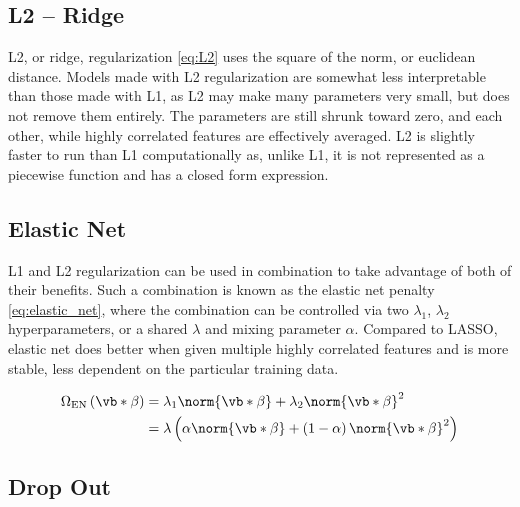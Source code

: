 \subsection{L2 -- Ridge}
\label{ml_general:reg:L2}

L2, or ridge, regularization \cref{eq:L2} uses the square of the norm, or euclidean distance.
Models made with L2 regularization are somewhat less interpretable than those made with L1,
as L2 may make many parameters very small, but does not remove them entirely.
The parameters are still shrunk toward zero, and each other,
while highly correlated features are effectively averaged.
L2 is slightly faster to run than L1 computationally as, unlike L1, it
is not represented as a piecewise function and has a closed form expression.

\subsection{Elastic Net}
\label{ml_general:reg:EN}

L1 and L2 regularization can be used in combination
to take advantage of both of their benefits.
Such a combination is known as the elastic net penalty \cref{eq:elastic_net},
where the combination can be controlled via two $\lambda_{1}$, $\lambda_{2}$ hyperparameters,
or a shared $\lambda$ and mixing parameter $\alpha$.
Compared to LASSO, elastic net does better when given multiple highly correlated features
and is more stable, \ie less dependent on the particular training data.

\begin{equation} \label{eq:elastic_net}
\begin{split}
\Omega_{\text{EN}}\left(\vb*{\beta}\right) &= \lambda_{1} \norm{\vb*{\beta}} + \lambda_{2} \norm{\vb*{\beta}}^{2}\\
&= \lambda \left( \alpha\norm{\vb*{\beta}} + \left(1-\alpha\right)\norm{\vb*{\beta}}^{2} \right)
\end{split}
\end{equation}


\subsection{Drop Out}
\label{ml_general:reg:Drop}

